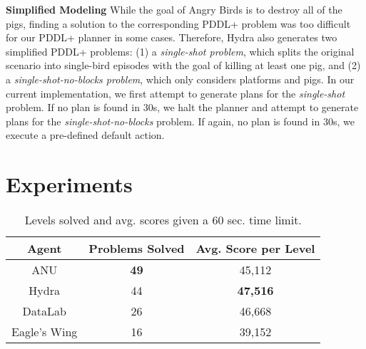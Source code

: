 \documentclass[letterpaper]{article} %
\begin{document}
\noindent\textbf{Simplified Modeling} While the goal of Angry Birds is to destroy all of the pigs, finding a solution to the corresponding PDDL+ problem was too difficult for our PDDL+ planner in some cases.
Therefore, Hydra also generates two simplified PDDL+ problems:
(1) a \textit{single-shot problem}, which splits the original scenario into single-bird episodes with the goal of killing at least one pig, and (2) a \textit{single-shot-no-blocks problem}, which only considers platforms and pigs. In our current implementation, we first attempt to generate plans for the \textit{single-shot} problem.
If no plan is found in 30s, we halt the planner and attempt to generate plans for the \textit{single-shot-no-blocks} problem.
If again, no plan is found in 30s, we execute a pre-defined default action.
































\vspace{-3.63mm}
\section{Experiments}

\begin{table}[tb!]
\centering
\small
\begin{tabular}{|c|c|c|}
\hline
\textbf{Agent} & \textbf{Problems Solved} & \textbf{Avg. Score per Level} \\ \hline
ANU    & \textbf{49}              & 45,112                      \\ \hline
Hydra          & 44                       & \textbf{47,516}             \\ \hline
DataLab        & 26                       & 46,668                      \\ \hline
Eagle's  Wing  & 16                       & 39,152                      \\ \hline
\end{tabular}
\caption{Levels solved and avg. scores given a 60 sec. time limit.}
\label{tab:results}
\end{table}
\end{document}
